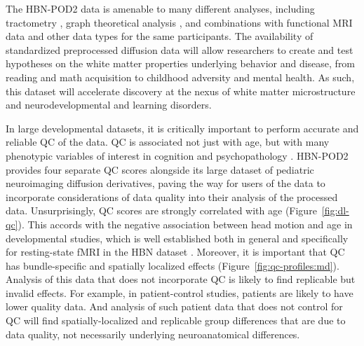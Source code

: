 \documentclass[fleqn,10pt,inline]{wlscirep}
\begin{document}
The HBN-POD2 data is amenable to many different analyses, including
tractometry \cite{yeatman2012-rc, yeatman2018browser, kruper2021evaluating}, graph theoretical analysis \cite{yeh2020-nu},
and combinations with functional MRI data and other data types for the same
participants. The availability of standardized preprocessed diffusion data will
allow researchers to create and test hypotheses on the white matter properties
underlying behavior and disease, from reading and math acquisition to childhood
adversity and mental health. As such, this dataset will accelerate discovery at
the nexus of white matter microstructure and neurodevelopmental and learning
disorders.

In large developmental datasets, it is critically important to perform accurate and reliable QC of
the data.
QC is associated not just with age, but with many
phenotypic variables of interest in cognition and psychopathology \cite{siegel2017quality}.
HBN-POD2 provides four separate QC scores alongside its large dataset
of pediatric neuroimaging diffusion derivatives, paving the way for users of the
data to incorporate considerations of data quality into their analysis of the
processed data. Unsurprisingly, QC scores are strongly correlated with
age (Figure~\ref{fig:dl-qc}). This accords with the negative association
between head motion and age in developmental studies, which is well established both in general
\cite{power2012spurious,satterthwaite2012impact,fair2012distinct,yendiki2014spurious}
and specifically for resting-state fMRI in the HBN dataset .
Moreover, it is important that QC has bundle-specific and spatially localized effects (Figure~\ref{fig:qc-profiles:md}). Analysis of this data that does not incorporate QC is likely to find replicable but invalid effects. For example, in patient-control studies, patients are likely to have lower quality data. And analysis of such patient data that does not control for QC will find spatially-localized and replicable group differences that are due to data quality, not necessarily underlying neuroanatomical differences.
\end{document}
